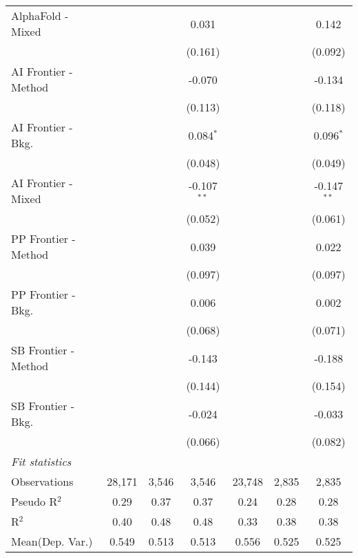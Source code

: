 \begin{tabular}{lcccccc}
   AlphaFold - Mixed    &              &             & 0.031         &                &              & 0.142\\   
                        &              &             & (0.161)       &                &              & (0.092)\\   
   AI Frontier - Method &              &             & -0.070        &                &              & -0.134\\   
                        &              &             & (0.113)       &                &              & (0.118)\\   
   AI Frontier - Bkg.   &              &             & 0.084$^{*}$   &                &              & 0.096$^{*}$\\   
                        &              &             & (0.048)       &                &              & (0.049)\\   
   AI Frontier - Mixed  &              &             & -0.107$^{**}$ &                &              & -0.147$^{**}$\\   
                        &              &             & (0.052)       &                &              & (0.061)\\   
   PP Frontier - Method &              &             & 0.039         &                &              & 0.022\\   
                        &              &             & (0.097)       &                &              & (0.097)\\   
   PP Frontier - Bkg.   &              &             & 0.006         &                &              & 0.002\\   
                        &              &             & (0.068)       &                &              & (0.071)\\   
   SB Frontier - Method &              &             & -0.143        &                &              & -0.188\\   
                        &              &             & (0.144)       &                &              & (0.154)\\   
   SB Frontier - Bkg.   &              &             & -0.024        &                &              & -0.033\\   
                        &              &             & (0.066)       &                &              & (0.082)\\   
   \midrule
   \emph{Fit statistics}\\
   Observations         & 28,171       & 3,546       & 3,546         & 23,748         & 2,835        & 2,835\\  
   Pseudo R$^2$         & 0.29         & 0.37        & 0.37          & 0.24           & 0.28         & 0.28\\  
   R$^2$                & 0.40         & 0.48        & 0.48          & 0.33           & 0.38         & 0.38\\  
Mean(Dep. Var.) & 0.549 & 0.513 & 0.513 & 0.556 & 0.525 & 0.525 \\
   

\end{tabular}
